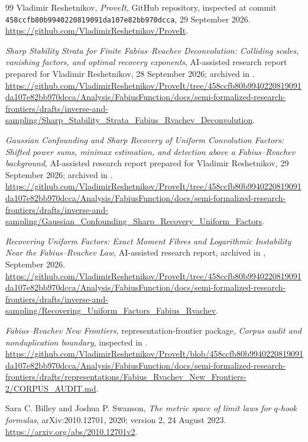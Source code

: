 \documentclass[11pt,letterpaper]{article}
\numberwithin{equation}{section}
\theoremstyle{definition}
\theoremstyle{remark}
\begin{document}
\begin{thebibliography}{99}
Vladimir Reshetnikov, \emph{ProveIt}, GitHub repository, inspected at commit
\texttt{458ccfb80b9940220819091da107e82bb970dcca}, 29 September 2026.
\url{https://github.com/VladimirReshetnikov/ProveIt}.

\emph{Sharp Stability Strata for Finite Fabius--Rvachev Deconvolution:
Colliding scales, vanishing factors, and optimal recovery exponents},
AI-assisted research report prepared for Vladimir Reshetnikov,
28 September 2026; archived in \cite{repo}.
\url{https://github.com/VladimirReshetnikov/ProveIt/tree/458ccfb80b9940220819091da107e82bb970dcca/Analysis/FabiusFunction/docs/semi-formalized-research-frontiers/drafts/inverse-and-sampling/Sharp_Stability_Strata_Fabius_Rvachev_Deconvolution}.

\emph{Gaussian Confounding and Sharp Recovery of Uniform Convolution Factors:
Shifted power sums, minimax estimation, and detection above a Fabius--Rvachev
background}, AI-assisted research report prepared for Vladimir Reshetnikov,
29 September 2026; archived in \cite{repo}.
\url{https://github.com/VladimirReshetnikov/ProveIt/tree/458ccfb80b9940220819091da107e82bb970dcca/Analysis/FabiusFunction/docs/semi-formalized-research-frontiers/drafts/inverse-and-sampling/Gaussian_Confounding_Sharp_Recovery_Uniform_Factors}.

\emph{Recovering Uniform Factors: Exact Moment Fibres and Logarithmic
Instability Near the Fabius--Rvachev Law}, AI-assisted research report,
archived in \cite{repo}, September 2026.
\url{https://github.com/VladimirReshetnikov/ProveIt/tree/458ccfb80b9940220819091da107e82bb970dcca/Analysis/FabiusFunction/docs/semi-formalized-research-frontiers/drafts/inverse-and-sampling/Recovering_Uniform_Factors_Fabius_Rvachev}.

\emph{Fabius--Rvachev New Frontiers}, representation-frontier package,
\emph{Corpus audit and nonduplication boundary}, inspected in \cite{repo}.
\url{https://github.com/VladimirReshetnikov/ProveIt/blob/458ccfb80b9940220819091da107e82bb970dcca/Analysis/FabiusFunction/docs/semi-formalized-research-frontiers/drafts/representations/Fabius_Rvachev_New_Frontiers-2/CORPUS_AUDIT.md}.

Sara C. Billey and Joshua P. Swanson,
\emph{The metric space of limit laws for $q$-hook formulas},
arXiv:2010.12701, 2020; version 2, 24 August 2023.
\url{https://arxiv.org/abs/2010.12701v2}.


\end{thebibliography}
\end{document}
